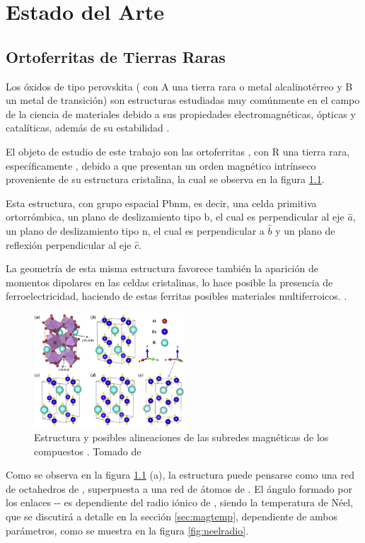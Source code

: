 \documentclass[../main.tex]{subfiles}
\begin{document}
\chapter{Estado del Arte}
\section{Ortoferritas de Tierras Raras}
Los óxidos de tipo perovskita ( con A una tierra rara o metal alcalinotérreo y B un metal de transición) son estructuras estudiadas muy comúnmente en el campo de la ciencia de materiales debido a sus propiedades electromagnéticas, ópticas y catalíticas, además de su estabilidad \cite{Wang2019}.

El objeto de estudio de este trabajo son las ortoferritas , con R una tierra rara, específicamente , debido a que presentan un orden magnético intrínseco proveniente de su estructura cristalina, la cual se observa en la figura \ref{fig:estructuras}. 

Esta estructura, con grupo espacial Pbnm, es decir, una celda primitiva ortorrómbica, un plano de deslizamiento tipo b, el cual es perpendicular al eje $\hat{a}$, un plano de deslizamiento tipo n, el cual es perpendicular a $\hat{b}$ y un plano de reflexión perpendicular al eje $\hat{c}$.

La geometría de esta misma estructura favorece también la aparición de momentos dipolares en las celdas cristalinas, lo hace posible la presencia de ferroelectricidad, haciendo de estas ferritas posibles materiales multiferroicos. \cite{Sharma2024}.
\begin{figure}[H]
    \centering
    \includegraphics[width=0.5\textwidth]{fig/estructura.jpg}
    \caption{Estructura y posibles alineaciones de las subredes magnéticas de los compuestos . Tomado de \cite{Wang2019}}
    \label{fig:estructuras}
\end{figure}

Como se observa en la figura \ref{fig:estructuras} (a), la estructura puede pensarse como una red de octahedros de , superpuesta a una red de átomos de . El ángulo formado por los enlaces -- es dependiente del radio iónico de , siendo la temperatura de Néel, que se discutirá a detalle en la sección \ref{sec:magtemp}, dependiente de ambos parámetros, como se muestra en la figura \ref{fig:neelradio}.
\end{document}
